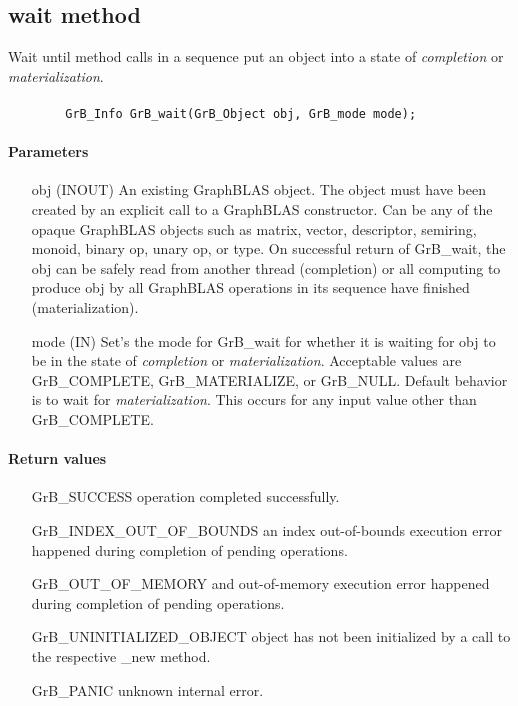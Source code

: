 \subsection{{\sf wait} method}
\label{Sec:GrB_wait}

Wait until method calls in a sequence put an object 
into a state of \emph{completion} or \emph{materialization}.

\paragraph{\syntax}

\begin{verbatim}
        GrB_Info GrB_wait(GrB_Object obj, GrB_mode mode);
\end{verbatim}

\paragraph{Parameters}

\begin{itemize}[leftmargin=1.1in]
        \item[{\sf obj}] ({\sf INOUT}) An existing GraphBLAS object.
        The object must have been created by an explicit call to a
        GraphBLAS constructor.  Can be any of the opaque GraphBLAS
        objects such as matrix, vector, descriptor, semiring, monoid,
        binary op, unary op, or type. On successful return of {\sf
        GrB\_wait}, the {\sf obj} can be safely read from another thread (completion)
        or all computing to produce {\sf obj} by all GraphBLAS operations 
        in its sequence have finished (materialization).   
        
        \item[{\sf mode}] ({\sf IN}) Set's the mode for {\sf GrB\_wait} for whether it is waiting 
        for {\sf obj} to be in the state of \emph{completion} or \emph{materialization}.  Acceptable 
        values are {\sf GrB\_COMPLETE}, {\sf GrB\_MATERIALIZE}, or {\sf GrB\_NULL}.
        Default behavior is to wait for \emph{materialization}.  This occurs for any input
        value other than {\sf GrB\_COMPLETE}.
\end{itemize}

\paragraph{Return values}
\begin{itemize}[leftmargin=2.3in]
	\item[{\sf GrB\_SUCCESS}]			operation completed successfully.
	\item[{\sf GrB\_INDEX\_OUT\_OF\_BOUNDS}]	an index out-of-bounds execution error happened during completion of pending operations.
	\item[{\sf GrB\_OUT\_OF\_MEMORY}]		and out-of-memory execution error happened during completion of pending operations.
	\item[{\sf GrB\_UNINITIALIZED\_OBJECT}]		object has not been initialized by a call to the respective {\sf *\_new} method.
	\item[{\sf GrB\_PANIC}]				unknown internal error.
\end{itemize}

